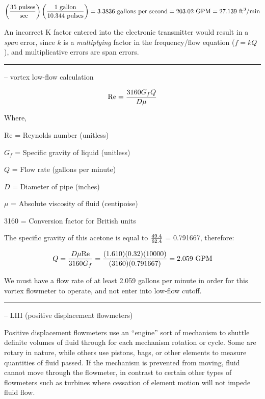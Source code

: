 \vskip 10pt

$$\left({35 \hbox{ pulses} \over \hbox{ sec}} \right) \left({ 1 \hbox{ gallon} \over 10.344 \hbox{ pulses}} \right) = 3.3836 \hbox{ gallons per second} = 203.02 \hbox{ GPM} = 27.139 \hbox{ ft}^3\hbox{/min}$$

\vskip 10pt

An incorrect K factor entered into the electronic transmitter would result in a {\it span} error, since $k$ is a {\it multiplying} factor in the frequency/flow equation ($f = kQ$), and multiplicative errors are span errors.


\filbreak \vskip 5pt \hrule \vskip 5pt  -- vortex low-flow calculation \vskip 10pt

$$\hbox{Re} = {{3160 G_f Q} \over {D \mu}}$$

\noindent
Where,

Re = Reynolds number (unitless)

$G_f$ = Specific gravity of liquid (unitless)

$Q$ = Flow rate (gallons per minute)

$D$ = Diameter of pipe (inches)

$\mu$ = Absolute viscosity of fluid (centipoise)

3160 = Conversion factor for British units

\vskip 10pt

The specific gravity of this acetone is equal to $49.4 \over 62.4$ = 0.791667, therefore:

$$Q = {D \mu \hbox{Re} \over 3160 G_f} = {(1.610)(0.32)(10000) \over (3160)(0.791667)} = 2.059 \hbox{ GPM}$$

\vskip 10pt

We must have a flow rate of at least 2.059 gallons per minute in order for this vortex flowmeter to operate, and not enter into low-flow cutoff.


\filbreak \vskip 5pt \hrule \vskip 5pt  -- LIII (positive displacement flowmeters) \vskip 10pt

Positive displacement flowmeters use an ``engine'' sort of mechanism to shuttle definite volumes of fluid through for each mechanism rotation or cycle.  Some are rotary in nature, while others use pistons, bags, or other elements to measure quantities of fluid passed.  If the mechanism is prevented from moving, fluid cannot move through the flowmeter, in contrast to certain other types of flowmeters such as turbines where cessation of element motion will not impede fluid flow.

